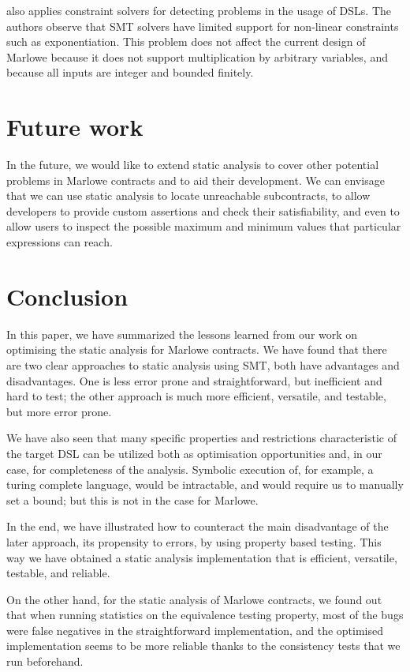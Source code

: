 \documentclass[english,runningheads]{llncs}
\begin{document}
\cite{keshishzadeh2013early} also applies constraint solvers for
detecting problems in the usage of DSLs. The authors observe that
SMT solvers have limited support for non-linear constraints such as
exponentiation. This problem does not affect the current design of
Marlowe because it does not support multiplication by arbitrary variables,
and because all inputs are integer and bounded finitely.

\section{Future work}

In the future, we would like to extend static analysis to cover other
potential problems in Marlowe contracts and to aid their development.
We can envisage that we can use static analysis to locate unreachable
subcontracts, to allow developers to provide custom assertions and
check their satisfiability, and even to allow users to inspect the
possible maximum and minimum values that particular expressions can
reach. 

\section{Conclusion}

In this paper, we have summarized the lessons learned from our work
on optimising the static analysis for Marlowe contracts. We have found
that there are two clear approaches to static analysis using SMT,
both have advantages and disadvantages. One is less error prone and
straightforward, but inefficient and hard to test; the other approach
is much more efficient, versatile, and testable, but more error prone.

We have also seen that many specific properties and restrictions characteristic
of the target DSL can be utilized both as optimisation opportunities
and, in our case, for completeness of the analysis. Symbolic execution
of, for example, a turing complete language, would be intractable,
and would require us to manually set a bound; but this is not in the
case for Marlowe.

In the end, we have illustrated how to counteract the main disadvantage
of the later approach, its propensity to errors, by using property
based testing. This way we have obtained a static analysis implementation
that is efficient, versatile, testable, and reliable.

On the other hand, for the static analysis of Marlowe contracts, we
found out that when running statistics on the equivalence testing
property, most of the bugs were false negatives in the straightforward
implementation, and the optimised implementation seems to be more
reliable thanks to the consistency tests that we run beforehand.
\end{document}

